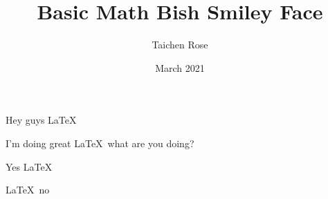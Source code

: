\documentclass{article}
\title{Basic Math Bish Smiley Face}
\author{Taichen Rose}
\date{March 2021}
\begin{document}
Hey guys \LaTeX

I'm doing great \LaTeX\ what are you doing?

Yes \LaTeX\

\LaTeX\ no 
\end{document}
